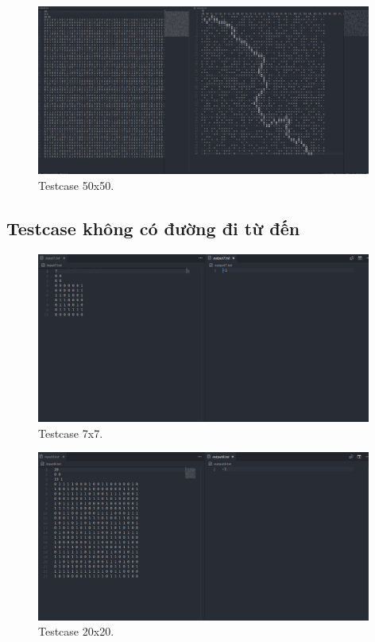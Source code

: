\begin{figure}[H]
\centering
\includegraphics[width=0.98\textwidth]{t6.png}
\caption{Testcase 50x50.}
\end{figure}

\subsection{Testcase không có đường đi từ  đến }

\begin{figure}[H]
\centering
\includegraphics[width=0.98\textwidth]{t7.png}
\caption{Testcase 7x7.}
\end{figure}

\begin{figure}[H]
\centering
\includegraphics[width=0.98\textwidth]{t8.png}
\caption{Testcase 20x20.}
\end{figure}

